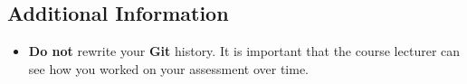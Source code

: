 \documentclass{article}
\begin{document}
\subsection*{Additional Information}
\begin{itemize}
    \item \textbf{Do not} rewrite your \textbf{Git} history. It is important that the course lecturer can see how you worked on your assessment over time. 
\end{itemize}
\end{document}
